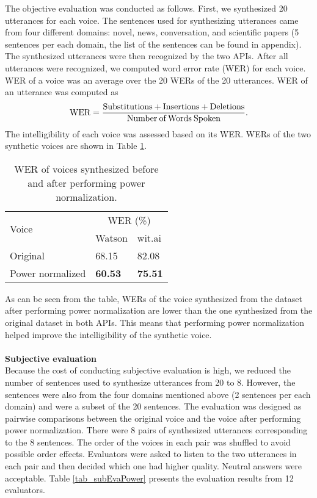 \documentclass[12pt]{article}
\begin{document}
The objective evaluation was conducted as follows. First, we synthesized 20 utterances for each voice. The sentences used for synthesizing utterances came from four different domains: novel, news, conversation, and scientific papers (5 sentences per each domain, the list of the sentences can be found in appendix). The synthesized utterances were then recognized by the two APIs. After all utterances were recognized, we computed word error rate (WER) for each voice. WER of a voice was an average over the 20 WERs of the 20 utterances. WER of an utterance was computed as
\begin{equation}\label{exp_wer}
    \text{WER} = \frac{\text{Substitutions} + \text{Insertions} + \text{Deletions}}{\text{Number\:of\:Words\:Spoken}}.
\end{equation}
The intelligibility of each voice was assessed based on its WER. WERs of the two synthetic voices are shown in Table \ref{tab_werPower}.

\begin{table}[]
\begin{center}
\caption{WER of voices synthesized before and after performing power normalization.}
\label{tab_werPower}
\vspace{3mm}
\begin{tabular}{|l|l|l|}
\hline
\multirow{2}{3.5cm}{Voice} &
\multicolumn{2}{c|}{WER (\%)} \\ \cline{2-3}
& Watson & wit.ai \\
\hline
Original           & 68.15          & 82.08 \\
Power normalized   & \textbf{60.53} & \textbf{75.51} \\
\hline
\end{tabular}
\end{center}
\end{table}

As can be seen from the table, WERs of the voice synthesized from the dataset after performing power normalization are lower than the one synthesized from the original dataset in both APIs. This means that performing power normalization helped improve the intelligibility of the synthetic voice.\\\\
\textbf{Subjective evaluation}
\vspace{0.28cm}\\
Because the cost of conducting subjective evaluation is high, we reduced the number of sentences used to synthesize utterances from 20 to 8. However, the sentences were also from the four domains mentioned above (2 sentences per each domain) and were a subset of the 20 sentences. The evaluation was designed as pairwise comparisons between the original voice and the voice after performing power normalization. There were 8 pairs of synthesized utterances corresponding to the 8 sentences. The order of the voices in each pair was shuffled to avoid possible order effects. Evaluators were asked to listen to the two utterances in each pair and then decided which one had higher quality. Neutral answers were acceptable. Table \ref{tab_subEvaPower} presents the evaluation results from 12 evaluators.
\end{document}
